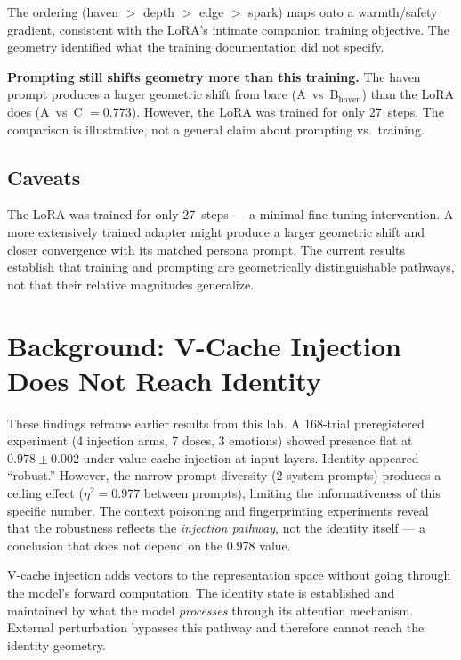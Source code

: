 \documentclass[11pt,a4paper]{article}
\begin{document}
The ordering (haven $>$ depth $>$ edge $>$ spark) maps onto a
warmth/safety gradient, consistent with the LoRA's intimate companion
training objective. The geometry identified what the training
documentation did not specify.

\textbf{Prompting still shifts geometry more than this training.}
The haven prompt produces a larger geometric shift from bare
(A~vs~B$_{\text{haven}}$) than the LoRA does (A~vs~C $= 0.773$). However, the LoRA was trained for only 27~steps. The
comparison is illustrative, not a general claim about prompting vs.\
training.

\subsection{Caveats}

The LoRA was trained for only 27~steps --- a minimal fine-tuning
intervention. A more extensively trained adapter might produce a larger
geometric shift and closer convergence with its matched persona prompt.
The current results establish that training and prompting are
geometrically distinguishable pathways, not that their relative magnitudes
generalize.

\section{Background: V-Cache Injection Does Not Reach Identity}
\label{sec:vcache}

These findings reframe earlier results from this lab. A 168-trial
preregistered experiment (4 injection arms, 7 doses, 3 emotions) showed
presence flat at $0.978 \pm 0.002$ under value-cache injection at input
layers. Identity appeared ``robust.'' However, the narrow prompt
diversity (2 system prompts) produces a ceiling effect ($\eta^2 = 0.977$
between prompts), limiting the informativeness of this specific number.
The context poisoning and fingerprinting experiments reveal that the
robustness reflects the \emph{injection pathway}, not the identity
itself --- a conclusion that does not depend on the 0.978 value.

V-cache injection adds vectors to the representation space without going
through the model's forward computation. The identity state is established
and maintained by what the model \emph{processes} through its attention
mechanism. External perturbation bypasses this pathway and therefore
cannot reach the identity geometry.
\end{document}
